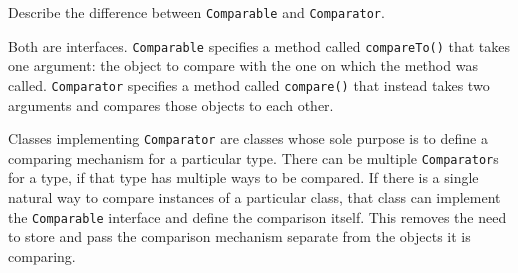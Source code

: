Describe the difference between \texttt{Comparable} and \texttt{Comparator}. \\
\begin{answer}
Both are interfaces.
\texttt{Comparable} specifies a method called \texttt{compareTo()} that takes one argument: the object to compare with the one on which the method was called.
\texttt{Comparator} specifies a method called \texttt{compare()} that instead takes two arguments and compares those objects to each other.

Classes implementing \texttt{Comparator} are classes whose sole purpose is to define a comparing mechanism for a particular type. There can be multiple \texttt{Comparator}s for a type, if that type has multiple ways to be compared. If there is a single natural way to compare instances of a particular class, that class can implement the \texttt{Comparable} interface and define the comparison itself. This removes the need to store and pass the comparison mechanism separate from the objects it is comparing.
\end{answer}
